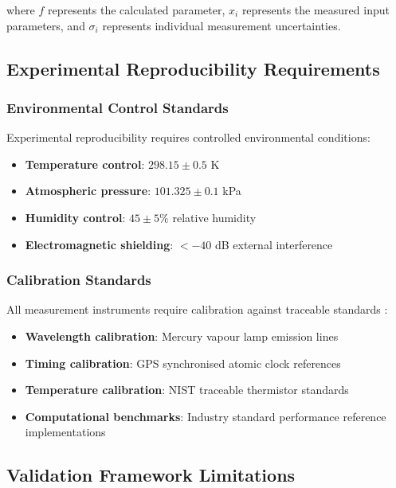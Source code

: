 \documentclass[12pt,a4paper]{article}
\begin{document}
where $f$ represents the calculated parameter, $x_i$ represents the measured input parameters, and $\sigma_i$ represents individual measurement uncertainties.

\subsection{Experimental Reproducibility Requirements}

\subsubsection{Environmental Control Standards}

Experimental reproducibility requires controlled environmental conditions:

\begin{itemize}
\item \textbf{Temperature control}: $298.15 \pm 0.5$ K
\item \textbf{Atmospheric pressure}: $101.325 \pm 0.1$ kPa  
\item \textbf{Humidity control}: $45 \pm 5\%$ relative humidity
\item \textbf{Electromagnetic shielding}: $< -40$ dB external interference
\end{itemize}

\subsubsection{Calibration Standards}

All measurement instruments require calibration against traceable standards \cite{ludlow2015optical}:

\begin{itemize}
\item \textbf{Wavelength calibration}: Mercury vapour lamp emission lines
\item \textbf{Timing calibration}: GPS synchronised atomic clock references
\item \textbf{Temperature calibration}: NIST traceable thermistor standards
\item \textbf{Computational benchmarks}: Industry standard performance reference implementations
\end{itemize}

\subsection{Validation Framework Limitations}
\end{document}
